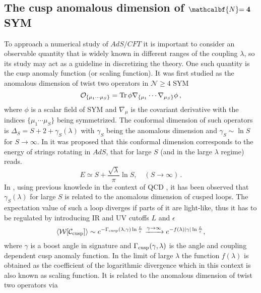 \subsection[The cusp anomalous dimension of $\mathcal{N}=4$ SYM]{The cusp anomalous dimension of $\mathcalbf{N} \mathbf{=4}$ SYM}
%
%
To approach a numerical study of $AdS/CFT$ it is important to consider an observable quantity that is widely known in different ranges of the  coupling $\lambda$, so its study may act as a guideline in discretizing the theory. One such quantity is the cusp anomaly function (or scaling function). It was first studied as the anomalous dimension of twist two operators in $\mathcal{N}\geq4$ SYM
%
%
\begin{equation}
\mathcal{O}_{\lbrace \mu_{1}\cdots\mu_{S}\rbrace} = {\rm Tr}\, \phi \nabla_{\lbrace\mu_{1}} \cdots \nabla_{\mu_{S}\rbrace} \phi\,,
\end{equation}
%
%
where $\phi$ is a scalar field of SYM and $\nabla_{\mu}$ is the covariant derivative with the indices $\lbrace \mu_{1} \cdots \mu_{S}\rbrace$ being symmetrized. The conformal dimension of such operators is $\Delta_{S} = S +2 + \gamma_{S}(\lambda)$ with $\gamma_{S}$ being the anomalous dimension and $\gamma_{S} \sim \ln S$ for $S \to \infty$. In \cite{Gubser:2002tv} it was proposed that this conformal dimension corresponds to the energy of strings rotating in $AdS$, that for large $S$ (and in the large $\lambda$ regime) reads.
%
%
\begin{equation}
E \simeq S + \frac{\sqrt{\lambda}}{\pi} \ln S , \quad  (S \to \infty)\,.
\end{equation}
%
%
In \cite{Kruczenski:2002fb}, using previous knowlede in the context of QCD \cite{Korchemsky:1992xv}, it has been observed that $\gamma_{S}(\lambda)$ for large $S$ is related to the anomalous dimension of cusped  loops. The expectation value of such a  loop diverges if parts of it are light-like, thus it has to be regulated by introducing IR and UV cutoffs $L$ and $\epsilon$
%
%
\begin{equation}
\langle \mathcal{W}[\mathcal{C_{\rm cusp}}] \rangle \sim e^{-\Gamma_{\rm cusp}(\lambda,\gamma) \ln\frac{L}{\epsilon}}  \xrightarrow{\gamma \to \infty} e^{-f(\lambda)\vert \gamma\vert \ln \frac{L}{\epsilon}},
\label{W_f}
\end{equation}
%
%
where $\gamma$ is a boost angle in  signature and $\Gamma_{\rm cusp}(\gamma,\lambda)$ is the angle and coupling dependent cusp anomaly function. In the limit of large $\lambda$ the function $f(\lambda)$ is obtained as the coefficient of the logarithmic divergence  which in this context is also known as scaling function. It is related to the anomalous dimension of twist two operators via \cite{Kruczenski:2002fb}
